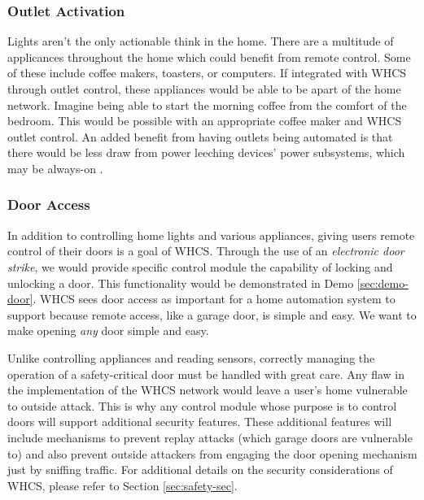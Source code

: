 \subsubsection{Outlet Activation}
Lights aren't the only actionable think in the home. There are a multitude of
applicances throughout the home which could benefit from remote control. Some
of these include coffee makers, toasters, or computers. If integrated with WHCS through outlet control, these appliances
would be able to be apart of the home network. Imagine being able to start the
morning coffee from the comfort of the bedroom. This would be possible with an
appropriate coffee maker and WHCS outlet control. An added benefit from having
outlets being automated is that there would be less draw from power leeching
devices' power subsystems, which may be always-on .

\subsubsection{Door Access}
In addition to controlling home lights and various appliances, giving users
remote control of their doors is  a goal of WHCS. Through the use of an
\emph{electronic door strike}, we would provide specific control module the
capability of locking and unlocking a door. This functionality would be
demonstrated in Demo \ref{sec:demo-door}. WHCS sees door access as important
for a home automation system to support because remote access, like a garage
door, is simple and easy. We want to make opening \emph{any} door simple and
easy.

Unlike controlling appliances and reading sensors, correctly managing the
operation of a safety-critical door must be handled with great care. Any flaw
in the implementation of the WHCS network would leave a user's home vulnerable
to outside attack. This is why any control module whose purpose is to control
doors will support additional security features. These additional features will
include mechanisms to prevent replay attacks (which garage doors are vulnerable
to) and also prevent outside attackers from engaging the door opening mechanism
just by sniffing traffic. For additional details on the security considerations
of WHCS, please refer to Section \ref{sec:safety-sec}.

